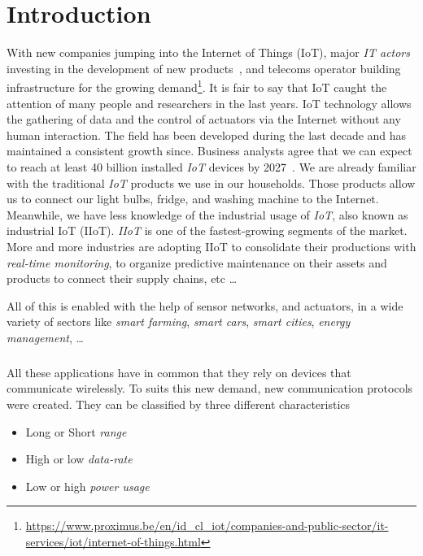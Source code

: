 \chapter{Introduction}

With new companies jumping into the Internet of Things (IoT), 
major \emph{IT actors} investing in the development of new
products~\cite{fortuneiot2019}, and telecoms operator building infrastructure 
for the growing demand\footnote{\url{https://www.proximus.be/en/id_cl_iot/companies-and-public-sector/it-services/iot/internet-of-things.html}}.
It is fair to say that IoT caught the attention of many people and researchers
in the last years.
IoT technology allows the gathering of data and the control of actuators via
the Internet without any human interaction.
The field has been developed during the last decade and has maintained a
consistent growth since.
Business analysts agree that we can expect to reach at least 40 billion
installed \emph{IoT} devices by 2027~\cite{businessinsider2020}.
We are already familiar with the traditional \emph{IoT} products
we use in our households. Those products allow us to connect our light bulbs,
fridge, and washing machine to the Internet.
Meanwhile, we have less knowledge of the industrial usage of \emph{IoT}, also
known as industrial IoT (IIoT). \emph{IIoT} is one of the fastest-growing
segments of the market.
More and more industries are adopting IIoT to consolidate their productions
with \emph{real-time monitoring}, to organize predictive maintenance on their
assets and products to connect their supply chains, etc \ldots

All of this is enabled with the help of sensor networks, and actuators, in a
wide variety of sectors like \emph{smart farming}, \emph{smart cars},
\emph{smart cities}, \emph{energy management}, \ldots

\paragraph{}

All these applications have in common that they rely on devices that
communicate wirelessly.
To suits this new demand, new communication protocols were created.
They can be classified by three different characteristics

\begin{itemize}
    \item Long or Short \emph{range}
    \item High or low \emph{data-rate}
    \item Low or high \emph{power usage} 
\end{itemize}

